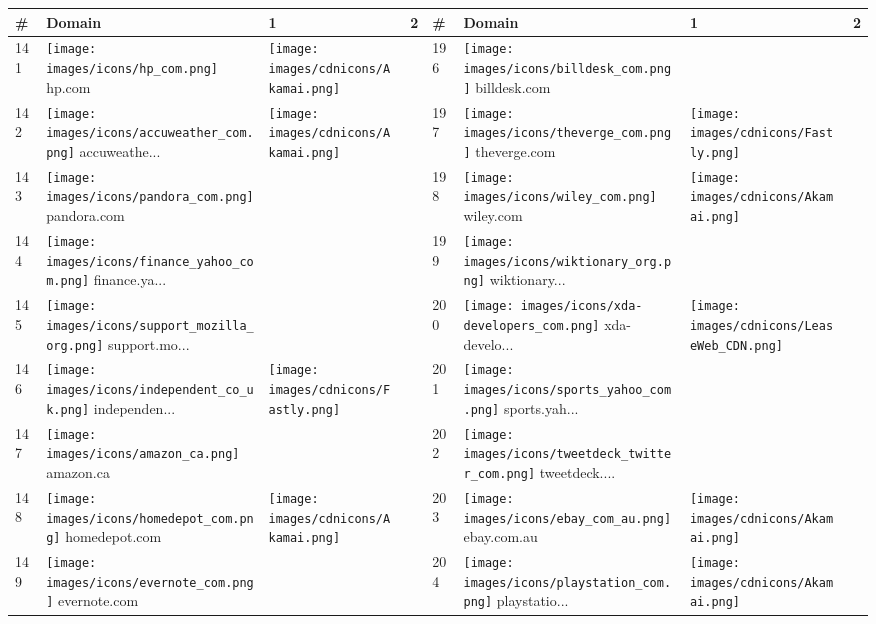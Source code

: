 \begin{table}[tbp]
\centering
\begin{tabular}{|llll|llll|}
\hline
\# & Domain & 1 & 2 & \# & Domain & 1 & 2 \\
\hline
141 & \texttt{[image: images/icons/hp\_com.png]} hp.com & \texttt{[image: images/cdnicons/Akamai.png]} & & 196 & \texttt{[image: images/icons/billdesk\_com.png]} billdesk.com & & \\
142 & \texttt{[image: images/icons/accuweather\_com.png]} accuweathe... & \texttt{[image: images/cdnicons/Akamai.png]} & & 197 & \texttt{[image: images/icons/theverge\_com.png]} theverge.com & \texttt{[image: images/cdnicons/Fastly.png]} & \\
143 & \texttt{[image: images/icons/pandora\_com.png]} pandora.com & & & 198 & \texttt{[image: images/icons/wiley\_com.png]} wiley.com & \texttt{[image: images/cdnicons/Akamai.png]} & \\
144 & \texttt{[image: images/icons/finance\_yahoo\_com.png]} finance.ya... & & & 199 & \texttt{[image: images/icons/wiktionary\_org.png]} wiktionary... & & \\
145 & \texttt{[image: images/icons/support\_mozilla\_org.png]} support.mo... & & & 200 & \texttt{[image: images/icons/xda-developers\_com.png]} xda-develo... & \texttt{[image: images/cdnicons/LeaseWeb\_CDN.png]} & \\
146 & \texttt{[image: images/icons/independent\_co\_uk.png]} independen... & \texttt{[image: images/cdnicons/Fastly.png]} & & 201 & \texttt{[image: images/icons/sports\_yahoo\_com.png]} sports.yah... & & \\
147 & \texttt{[image: images/icons/amazon\_ca.png]} amazon.ca & & & 202 & \texttt{[image: images/icons/tweetdeck\_twitter\_com.png]} tweetdeck.... & & \\
148 & \texttt{[image: images/icons/homedepot\_com.png]} homedepot.com & \texttt{[image: images/cdnicons/Akamai.png]} & & 203 & \texttt{[image: images/icons/ebay\_com\_au.png]} ebay.com.au & \texttt{[image: images/cdnicons/Akamai.png]} & \\
149 & \texttt{[image: images/icons/evernote\_com.png]} evernote.com & & & 204 & \texttt{[image: images/icons/playstation\_com.png]} playstatio... & \texttt{[image: images/cdnicons/Akamai.png]} & \\

\end{tabular}
\end{table}
